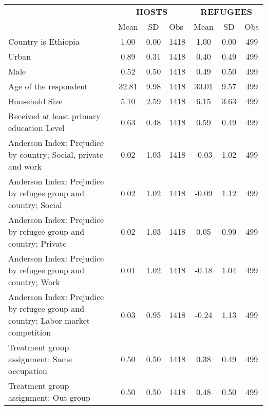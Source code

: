 {
\def\sym#1{\ifmmode^{#1}\else\(^{#1}\)\fi}
\begin{tabular}{l*{2}{ccc}}
\toprule
                    &\multicolumn{3}{c}{\textbf{HOSTS}}    &\multicolumn{3}{c}{\textbf{REFUGEES}} \\
                    &\multicolumn{1}{c}{{Mean}}&\multicolumn{1}{c}{{SD}}&\multicolumn{1}{l}{{Obs}}&\multicolumn{1}{c}{{Mean}}&\multicolumn{1}{c}{{SD}}&\multicolumn{1}{l}{{Obs}}\\
\midrule
Country is Ethiopia &        1.00&        0.00&        1418&        1.00&        0.00&         499\\
\addlinespace
Urban               &        0.89&        0.31&        1418&        0.40&        0.49&         499\\
\addlinespace
Male                &        0.52&        0.50&        1418&        0.49&        0.50&         499\\
\addlinespace
Age of the respondent&       32.81&        9.98&        1418&       30.01&        9.57&         499\\
\addlinespace
Household Size      &        5.10&        2.59&        1418&        6.15&        3.63&         499\\
\addlinespace
Received at least primary education Level&        0.63&        0.48&        1418&        0.59&        0.49&         499\\
\addlinespace
Anderson Index: Prejudice by country; Social, private and work&        0.02&        1.03&        1418&       -0.03&        1.02&         499\\
\addlinespace
Anderson Index: Prejudice by refugee group and country; Social &        0.02&        1.02&        1418&       -0.09&        1.12&         499\\
\addlinespace
Anderson Index: Prejudice by refugee group and country; Private&        0.02&        1.03&        1418&        0.05&        0.99&         499\\
\addlinespace
Anderson Index: Prejudice by refugee group and country; Work&        0.01&        1.02&        1418&       -0.18&        1.04&         499\\
\addlinespace
Anderson Index: Prejudice by refugee group and country; Labor market competition&        0.03&        0.95&        1418&       -0.24&        1.13&         499\\
\addlinespace
Treatment group assignment: Same occupation&        0.50&        0.50&        1418&        0.38&        0.49&         499\\
\addlinespace
Treatment group assignment: Out-group&        0.50&        0.50&        1418&        0.48&        0.50&         499\\
\bottomrule
\end{tabular}
}
